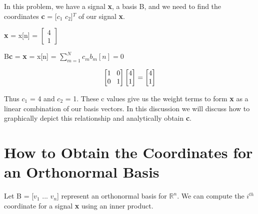 \documentclass[11pt]{article}
\begin{document}
\vspace{4mm}

 In this problem, we have a signal \textbf{x}, a basis B, and we need to find the coordinates \textbf{c} = [$c_1$ $c_2$]$^T$ of our signal \textbf{x}.

\begin{center}

\textbf{x} = x[n] = 
$
\begin{bmatrix}

4\\
1 

\end{bmatrix}
$
\end{center}
\vspace{2mm}

\begin{center}

B\textbf{c} = \textbf{x} = x[n] = $\sum\limits_{m = 1}^{N} c_m b_m[n] = 0$
\end{center}

\vspace{2mm}

\[
\begin{bmatrix}
   1 \hspace{3mm} 0       \\
   0 \hspace{3mm} 1            
\end{bmatrix}
\begin{bmatrix}
    4 \\
    1
\end{bmatrix}
= 
\begin{bmatrix}
    4  \\
    1
\end{bmatrix}
\]

\vspace{4mm}

Thus $c_1$ = 4 and $c_2$ = 1. These c values give us the weight terms to form \textbf{x} as a linear combination of our basis vectors. In this discussion we will discuss how to graphically depict this relationship and analytically obtain \textbf{c}.\newpage

\section{How to Obtain the Coordinates for an Orthonormal Basis}

Let B = [$v_1$ ... $v_n$] represent an orthonormal basis for $\mathbb{R}^n$. We can compute the $i^{th}$ coordinate for a signal \textbf{x} using an inner product. \\
\end{document}
